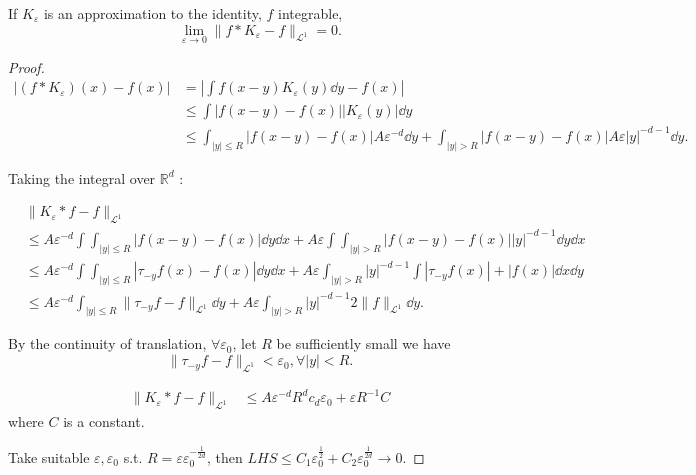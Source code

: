 \begin{theorem}
    If $K_\varepsilon$ is an approximation to the identity, $f$ integrable,
	\[
	\lim_{\varepsilon \to 0} \lVert f*K_\varepsilon - f \rVert _{\mathcal{L}^1} = 0.
	\]
\end{theorem}
\begin{proof}[Proof]
    \begin{align*}
        |(f*K_\varepsilon)(x) - f(x)|
		&= \left|\int f(x-y)K_\varepsilon(y)\dd y - f(x)\right|\\
		&\le \int |f(x-y)-f(x)| |K_\varepsilon(y)|\dd y\\
		&\le \int _{|y|\le R} |f(x-y)-f(x)| A\varepsilon^{-d}\dd y
		+ \int _{|y|>R} |f(x-y)-f(x)| A\varepsilon |y|^{-d-1}\dd y.
    \end{align*}

	Taking the integral over $\mathbb{R}^d$ :

	\begin{align*}
		&\lVert K_\varepsilon*f - f \rVert _{\mathcal{L}^1}\\
		&\le A\varepsilon^{-d} \int \int_{|y|\le R} |f(x-y)-f(x)|\dd y \dd x
		+A\varepsilon\int \int_{|y|>R} |f(x-y)-f(x)||y|^{-d-1}\dd y\dd x\\
		&\le A\varepsilon^{-d} \int\int_{|y|\le R}|\tau_{-y}f(x)-f(x)|\dd y\dd x
		+ A\varepsilon \int_{|y|>R}|y|^{-d-1}\int |\tau_{-y}f(x)|+|f(x)|\dd x\dd y\\
		&\le A\varepsilon^{-d}\int_{|y|\le R}\lVert \tau_{-y}f-f \rVert _{\mathcal{L}^1}
		\dd y + A\varepsilon \int_{|y|>R} |y|^{-d-1} 2\lVert f \rVert _{\mathcal{L}^1}\dd y.
	\end{align*}

	By the continuity of translation, $\forall \varepsilon_0$,
	let $R$ be sufficiently small we have
	\[
	\lVert \tau_{-y}f-f \rVert _{\mathcal{L}^1} < \varepsilon_0, \forall|y|<R.
	\]

	\begin{align*}
		\lVert K_\varepsilon*f - f \rVert _{\mathcal{L}^1}
		&\le A\varepsilon^{-d}R^{d}c_d\varepsilon_0 + \varepsilon R^{-1} C
	\end{align*}
	where $C$ is a constant.

	Take suitable $\varepsilon,\varepsilon_0$ s.t.
	$R = \varepsilon\varepsilon_0^{-\frac{1}{2d}}$,
	then $LHS \le C_1 \varepsilon_0^{\frac{1}{2}} + C_2 \varepsilon_0^{\frac{1}{2d}}\to 0$.
\end{proof}

